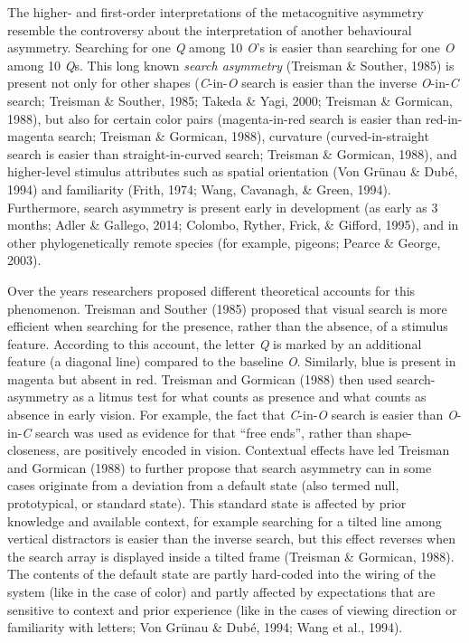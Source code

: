 \documentclass[
  english,
  man,floatsintext]{apa6}
\begin{document}
The higher- and first-order interpretations of the metacognitive asymmetry resemble the controversy about the interpretation of another behavioural asymmetry. Searching for one \emph{Q} among 10 \emph{O}'s is easier than searching for one \emph{O} among 10 \emph{Q}s. This long known \emph{search asymmetry} (Treisman \& Souther, 1985) is present not only for other shapes (\emph{C}-in-\emph{O} search is easier than the inverse \emph{O}-in-\emph{C} search; Treisman \& Souther, 1985; Takeda \& Yagi, 2000; Treisman \& Gormican, 1988), but also for certain color pairs (magenta-in-red search is easier than red-in-magenta search; Treisman \& Gormican, 1988), curvature (curved-in-straight search is easier than straight-in-curved search; Treisman \& Gormican, 1988), and higher-level stimulus attributes such as spatial orientation (Von Grünau \& Dubé, 1994) and familiarity (Frith, 1974; Wang, Cavanagh, \& Green, 1994). Furthermore, search asymmetry is present early in development (as early as 3 months; Adler \& Gallego, 2014; Colombo, Ryther, Frick, \& Gifford, 1995), and in other phylogenetically remote species (for example, pigeons; Pearce \& George, 2003).

Over the years researchers proposed different theoretical accounts for this phenomenon. Treisman and Souther (1985) proposed that visual search is more efficient when searching for the presence, rather than the absence, of a stimulus feature. According to this account, the letter \emph{Q} is marked by an additional feature (a diagonal line) compared to the baseline \emph{O}. Similarly, blue is present in magenta but absent in red. Treisman and Gormican (1988) then used search-asymmetry as a litmus test for what counts as presence and what counts as absence in early vision. For example, the fact that \emph{C}-in-\emph{O} search is easier than \emph{O}-in-\emph{C} search was used as evidence for that \enquote{free ends}, rather than shape-closeness, are positively encoded in vision. Contextual effects have led Treisman and Gormican (1988) to further propose that search asymmetry can in some cases originate from a deviation from a default state (also termed null, prototypical, or standard state). This standard state is affected by prior knowledge and available context, for example searching for a tilted line among vertical distractors is easier than the inverse search, but this effect reverses when the search array is displayed inside a tilted frame (Treisman \& Gormican, 1988). The contents of the default state are partly hard-coded into the wiring of the system (like in the case of color) and partly affected by expectations that are sensitive to context and prior experience (like in the cases of viewing direction or familiarity with letters; Von Grünau \& Dubé, 1994; Wang et al., 1994).
\end{document}
